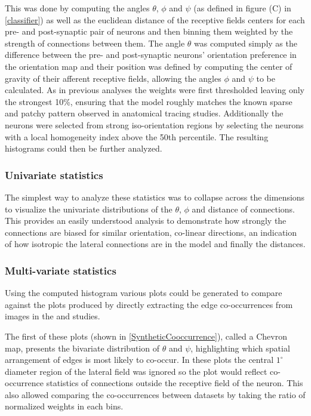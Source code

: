 This was done by computing the angles $\theta$, $\phi$ and $\psi$ (as
defined in figure (C) in \ref{classifier}) as well as the euclidean
distance of the receptive fields centers for each pre- and
post-synaptic pair of neurons and then binning them weighted by the
strength of connections between them. The angle $\theta$ was computed
simply as the difference between the pre- and post-synaptic neurons'
orientation preference in the orientation map and their position was
defined by computing the center of gravity of their afferent receptive
fields, allowing the angles $\phi$ and $\psi$ to be calculated. As in
previous analyses the weights were first thresholded leaving only the
strongest 10\%, ensuring that the model roughly matches the known
sparse and patchy pattern observed in anatomical tracing
studies. Additionally the neurons were selected from strong
iso-orientation regions by selecting the neurons with a local
homogeneity index above the 50th percentile. The resulting histograms
could then be further analyzed.

\subsubsection{Univariate statistics}

The simplest way to analyze these statistics was to collapse across
the dimensions to visualize the univariate distributions of the
$\theta$, $\phi$ and distance of connections. This provides an easily
understood analysis to demonstrate how strongly the connections are
biased for similar orientation, co-linear directions, an indication of
how isotropic the lateral connections are in the model and finally the
distances.

\subsubsection{Multi-variate statistics}

Using the computed histogram various plots could be generated to
compare against the plots produced by directly extracting the edge
co-occurrences from images in the \cite{Perrinet2015} and
\cite{Geisler2001} studies.

The first of these plots (shown in \ref{SyntheticCooccurrence}),
called a Chevron map, presents the bivariate distribution of $\theta$
and $\psi$, highlighting which spatial arrangement of edges is most
likely to co-occur. In these plots the central $1^\circ$ diameter
region of the lateral field was ignored so the plot would reflect
co-occurrence statistics of connections outside the receptive field of
the neuron. This also allowed comparing the co-occurrences between
datasets by taking the ratio of normalized weights in each bins.

